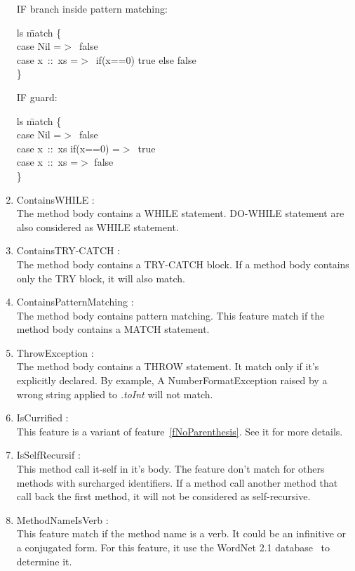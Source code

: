\documentclass[12pt]{article}
\newcommand{\code}[1]{{\fontfamily{phv}\selectfont \small{\begin{tabbing} #1 \end{tabbing}}}}
\begin{document}
\begin{enumerate}
\begin{minipage}{8cm}
IF branch inside pattern matching:
\code{
ls \=match \{\\
\>case Nil =$>$\ false\\
\>case x\ ::\ xs =$>$\ if(x==0) true else false\\
\}\\
}
\end{minipage}
\begin{minipage}{10cm}
IF guard:
\code{
ls \=match \{\\
\>case Nil =$>$\ false\\
\>case x\ ::\ xs if(x==0) =$>$\ true\\
\>case x\ ::\ xs =$>$ false\\
\}
}\end{minipage}
\item ContainsWHILE :\\
	The method body contains a WHILE statement. DO-WHILE statement are also considered as WHILE statement.
\item ContainsTRY-CATCH :\\
	The method body contains a TRY-CATCH block. If a method body contains only the TRY block, it will also match.
\item ContainsPatternMatching :\label{fPatternMatching} \\
	The method body contains pattern matching. This feature match if the method body contains a MATCH statement.
\item ThrowException :\\
	The method body contains a THROW statement. It match only if it's explicitly declared. By example, A NumberFormatException raised by a wrong string applied to \textit{.toInt} will not match.
\item IsCurrified : \\
	This feature is a variant of feature~\ref{fNoParenthesis}. See it for more details.
\item IsSelfRecursif : \\
	This method call it-self in it's body. The feature don't match for others methods with surcharged identifiers. If a method call another method that call back the first method, it will not be considered as self-recursive.
\item MethodNameIsVerb : \label{fVerb}\\
	This feature match if the method name is a verb. It could be an infinitive or a conjugated form. For this feature, it use the WordNet 2.1 database~\cite{wordNet} to determine it.

\end{enumerate}
\end{document}
